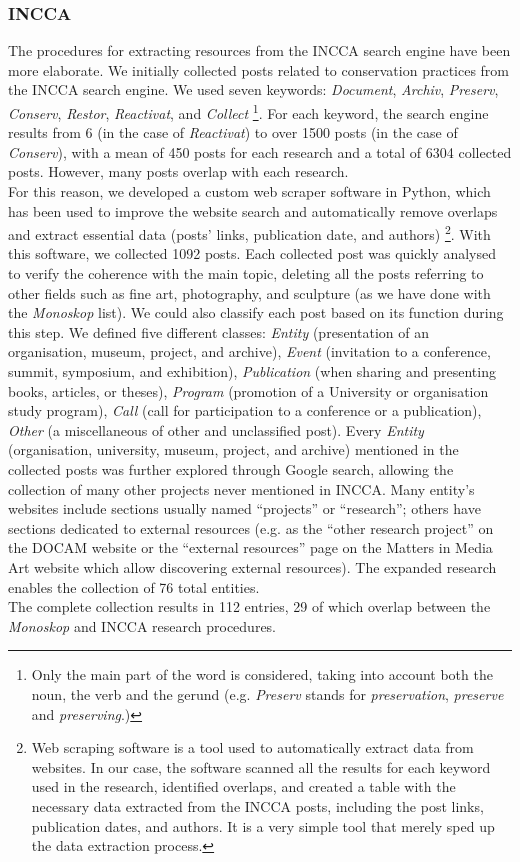 \subsubsection*{INCCA}
The procedures for extracting resources from the INCCA search engine have been more elaborate. We initially collected posts related to conservation practices from the INCCA search engine. We used seven keywords: \textit{Document}, \textit{Archiv}, \textit{Preserv}, \textit{Conserv}, \textit{Restor}, \textit{Reactivat}, and \textit{Collect}
\footnote{Only the main part of the word is considered, taking into account both the noun, the verb and the gerund (e.g. \textit{Preserv} stands for \textit{preservation}, \textit{preserve} and \textit{preserving}.)
}.
 For each keyword, the search engine results from 6 (in the case of \textit{Reactivat}) to over 1500 posts (in the case of \textit{Conserv}), with a mean of 450 posts for each research and a total of 6304 collected posts. However, many posts overlap with each research.\\
For this reason, we developed a custom web scraper software in Python, which has been used to improve the website search and automatically remove overlaps and extract essential data (posts’ links, publication date, and authors)
\footnote{Web scraping software is a tool used to automatically extract data from websites. In our case, the software scanned all the results for each keyword used in the research, identified overlaps, and created a table with the necessary data extracted from the INCCA posts, including the post links, publication dates, and authors. It is a very simple tool that merely sped up the data extraction process.}. 
With this software, we collected 1092 posts. Each collected post was quickly analysed to verify the coherence with the main topic, deleting all the posts referring to other fields such as fine art, photography, and sculpture (as we have done with the \textit{Monoskop} list). We could also classify each post based on its function during this step. We defined five different classes: \textit{Entity} (presentation of an organisation, museum, project, and archive), \textit{Event} (invitation to a conference, summit, symposium, and exhibition), \textit{Publication} (when sharing and presenting books, articles, or theses), \textit{Program} (promotion of a University or organisation study program), \textit{Call} (call for participation to a conference or a publication), \textit{Other} (a miscellaneous of other and unclassified post). Every \textit{Entity} (organisation, university, museum, project, and archive) mentioned in the collected posts was further explored through Google search, allowing the collection of many other projects never mentioned in INCCA. Many entity's websites include sections usually named ``projects'' or ``research''; others have sections dedicated to external resources (e.g. as the ``other research project'' on the DOCAM website or the ``external resources'' page on the Matters in Media Art website which allow discovering external resources). The expanded research enables the collection of 76 total entities.\\
The complete collection results in 112 entries, 29 of which overlap between the \textit{Monoskop} and INCCA research procedures.\\

